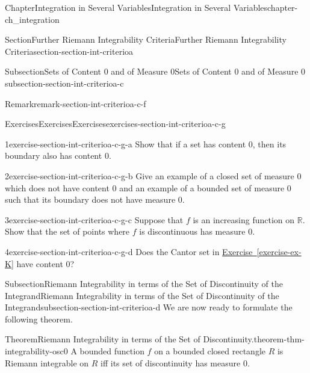 \documentclass[oneside,10pt,]{book}
\newcommand{\xreffont}{\relax}
\numberwithin{equation}{section}
\newcommand{\bbR}{\mathbb{R}}
\begin{document}
\begin{chapterptx}{Chapter}{Integration in Several Variables}{}{Integration in Several Variables}{}{}{chapter-ch_integration}
\begin{sectionptx}{Section}{Further Riemann Integrability Criteria}{}{Further Riemann Integrability Criteria}{}{}{section-section-int-criterioa}
\begin{subsectionptx}{Subsection}{Sets of Content \(0\) and of Measure \(0\)}{}{Sets of Content \(0\) and of Measure \(0\)}{}{}{subsection-section-int-criterioa-c}
\begin{remark}{Remark}{}{remark-section-int-criterioa-c-f}
\end{remark}
%
%
\typeout{************************************************}
\typeout{************************************************}
%
\begin{exercises-subsubsection-numberless}{Exercises}{Exercises}{}{Exercises}{}{}{exercises-section-int-criterioa-c-g}
\begin{divisionexercise}{1}{}{}{exercise-section-int-criterioa-c-g-a}%
Show that if a set has content \(0\), then its boundary also has content \(0\).%
\end{divisionexercise}%
\begin{divisionexercise}{2}{}{}{exercise-section-int-criterioa-c-g-b}%
Give an example of a closed set of measure \(0\) which does not have content \(0\) and an example of a bounded set of measure \(0\) such that its boundary does not have measure \(0\).%
\end{divisionexercise}%
\begin{divisionexercise}{3}{}{}{exercise-section-int-criterioa-c-g-c}%
Suppose that \(f\) is an increasing function on \(\bbR\). Show that the set of points where \(f\) is discontinuous has measure \(0\).%
\end{divisionexercise}%
\begin{divisionexercise}{4}{}{}{exercise-section-int-criterioa-c-g-d}%
Does the Cantor set in \hyperref[exercise-ex-K]{Exercise~{\xreffont\ref{exercise-ex-K}}} have content \(0\)?%
\end{divisionexercise}%
\end{exercises-subsubsection-numberless}
\end{subsectionptx}
%
%
\typeout{************************************************}
\typeout{************************************************}
%
\begin{subsectionptx}{Subsection}{Riemann Integrability in terms of the Set of Discontinuity of the Integrand}{}{Riemann Integrability in terms of the Set of Discontinuity of the Integrand}{}{}{subsection-section-int-criterioa-d}
We are now ready to formulate the following theorem.%
\begin{theorem}{Theorem}{Riemann Integrability in terms of the Set of Discontinuity.}{}{theorem-thm-integrability-osc0}%
A bounded function \(f\) on a bounded closed rectangle \(R\) is Riemann integrable on \(R\) iff its set of discontinuity has measure \(0\).%
\end{theorem}

\end{subsectionptx}
\end{sectionptx}
\end{chapterptx}
\end{document}
